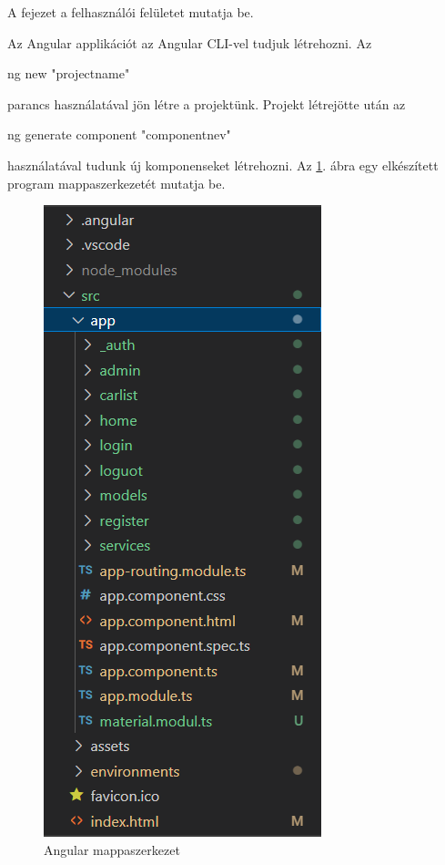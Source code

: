 
A fejezet a felhasználói felületet mutatja be.

Az Angular applikációt az Angular CLI-vel tudjuk létrehozni. Az
\begin{java}
ng new "projectname"
\end{java} 
parancs használatával jön létre a projektünk. Projekt létrejötte után az
\begin{java}
ng generate component "componentnev"
\end{java}
 használatával tudunk új komponenseket létrehozni.
Az \ref{fig:mappaszerkezet}. ábra egy elkészített program mappaszerkezetét mutatja be.

\begin{figure}[h]
\centering
\includegraphics[scale=0.6]{images/angular_mappaszerkezet.png}
\caption{Angular mappaszerkezet}
\label{fig:mappaszerkezet}
\end{figure}
\newpage

